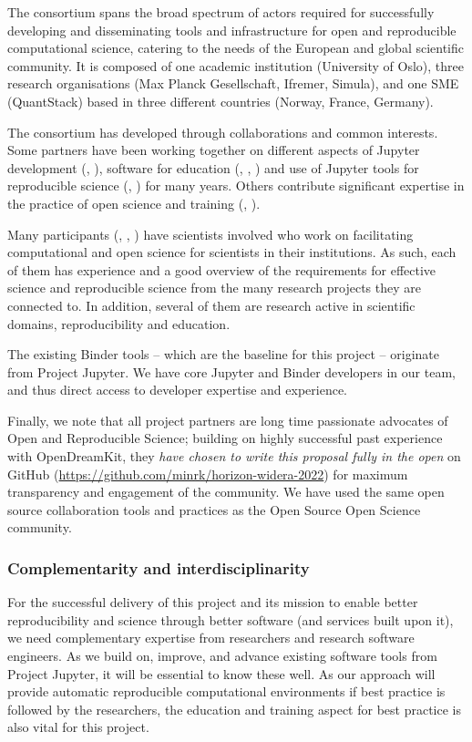 The \TheProject consortium spans the broad spectrum of actors required for
successfully developing and disseminating tools and infrastructure for open and
reproducible computational science, catering to the needs of the European and
global scientific community. It is composed of one academic institution
(University of Oslo), three research organisations (Max Planck Gesellschaft, Ifremer,
Simula), and one SME (QuantStack) based in three different countries (Norway,
France, Germany).

The consortium has developed through collaborations and common interests. Some
partners have been working together on different aspects of Jupyter development
(, ), software for education (, ,
) and use of Jupyter tools for reproducible science (, )
for many years. Others contribute significant expertise in
the practice of open science and training (, ).

Many participants (, , ) have scientists involved who work on
facilitating computational and open science for scientists in their
institutions. As such, each of them has experience and a good overview of the
requirements for effective science and reproducible science from the many
research projects they are connected to. In addition, several of them are
research active in scientific domains, reproducibility and education.

The existing Binder tools -- which are the baseline for this project --
originate from Project Jupyter. We have core Jupyter and Binder developers in
our team, and thus direct access to developer expertise and experience.

Finally, we note that all project partners are long time passionate advocates of
Open and Reproducible Science; building on highly successful past experience
with OpenDreamKit, they \emph{have chosen to write this proposal fully in the
  open} on GitHub
(\href{https://github.com/minrk/horizon-widera-2022}{https://github.com/minrk/horizon-widera-2022})
for maximum transparency and engagement of the community. We have used the same
open source collaboration tools and practices as the Open Source Open Science
community.

\subsubsection{Complementarity and interdisciplinarity}

For the successful delivery of this project and its mission to enable better
reproducibility and science through better software (and services built upon it),
we need complementary expertise from researchers and research software
engineers. As we build on, improve, and advance existing software tools from
Project Jupyter, it will be essential to know these well. As our approach will
provide automatic reproducible computational environments if best practice is
followed by the researchers, the education and training aspect for best practice
is also vital for this project.

